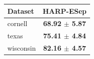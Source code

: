\begin{tabular}{lc}
\toprule
Dataset & HARP-ESep \\
\midrule
cornell & \textbf{68.92 $\pm$ 5.87} \\
texas & \textbf{75.41 $\pm$ 4.84} \\
wisconsin & \textbf{82.16 $\pm$ 4.57} \\
\bottomrule
\end{tabular}
